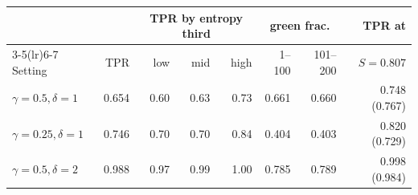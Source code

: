 \begin{tabular}{@{}lrrrrrrr@{}}
\toprule
 & & \multicolumn{3}{c}{TPR by entropy third} & \multicolumn{2}{c}{green frac.} & TPR at \\
\cmidrule(lr){3-5}\cmidrule(lr){6-7}
Setting & TPR & low & mid & high & 1--100 & 101--200 & $S{=}0.807$ \\
\midrule
$\gamma{=}0.5,\delta{=}1$ & 0.654 & 0.60 & 0.63 & 0.73 & 0.661 & 0.660 & 0.748 (0.767) \\
$\gamma{=}0.25,\delta{=}1$ & 0.746 & 0.70 & 0.70 & 0.84 & 0.404 & 0.403 & 0.820 (0.729) \\
$\gamma{=}0.5,\delta{=}2$ & 0.988 & 0.97 & 0.99 & 1.00 & 0.785 & 0.789 & 0.998 (0.984) \\
\bottomrule
\end{tabular}